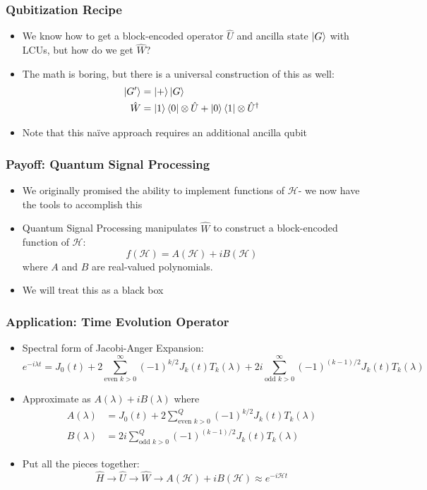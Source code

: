 \documentclass[aspectratio=169]{beamer}
\begin{document}
\begin{frame}
	\frametitle{Qubitization Recipe}
	\begin{itemize}[<+->]
		\item We know how to get a block-encoded operator $\hat{U}$ and ancilla state $\ket{G}$ with LCUs, but how do we get $\hat{W}$?
	\item The math is boring, but there is a universal construction of this as well:
	\begin{align}
		\nonumber \ket{G'} &= \ket{+}\ket{G}\\
		\nonumber \hat{W} &= \ket{1}\bra{0}\otimes\hat{U} + \ket{0}\bra{1}\otimes\hat{U}^{\dagger}
	\end{align}
	\item Note that this na{\"i}ve approach requires an additional ancilla qubit
	\end{itemize}
\end{frame}

\begin{frame}
	\frametitle{Payoff: Quantum Signal Processing}
	\begin{itemize}[<+->]
	\item We originally promised the ability to implement functions of $\mathcal{H}$- we now have the tools to accomplish this
	\item Quantum Signal Processing manipulates $\hat{W}$ to construct a block-encoded function of $\mathcal{H}$:
	\begin{equation}\nonumber
	f(\mathcal{H}) = A(\mathcal{H})+iB(\mathcal{H})
	\end{equation}
	where $A$ and $B$ are real-valued polynomials.
	\item We will treat this as a black box
	\end{itemize}
\end{frame}

\begin{frame}
	\frametitle{Application: Time Evolution Operator}
	\begin{itemize}[<+->]
	\item Spectral form of Jacobi-Anger Expansion:
		\begin{equation}\nonumber
			e^{-i\lambda t} = J_0(t) + 2\sum_{\text{even }k >0}^{\infty}(-1)^{k/2}J_k(t)T_k(\lambda) + 2i\sum_{\text{odd }k >0}^{\infty}(-1)^{(k-1)/2}J_k(t)T_k(\lambda)
		\end{equation}
	\item Approximate as $A(\lambda)+iB(\lambda)$ where
	\begin{align}
		\nonumber A(\lambda) &=  J_0(t) + 2\sum_{\text{even }k >0}^{Q}(-1)^{k/2}J_k(t)T_k(\lambda)\\
		\nonumber B(\lambda) &=  2i\sum_{\text{odd }k >0}^{Q}(-1)^{(k-1)/2}J_k(t)T_k(\lambda)
	\end{align}
	\item Put all the pieces together:
		\begin{equation}\nonumber
			\hat{H}\rightarrow\hat{U}\rightarrow\hat{W}\rightarrow A(\mathcal{H})+iB(\mathcal{H})\approx e^{-i\mathcal{H}t}
		\end{equation}
	\end{itemize}
\end{frame}
\end{document}

